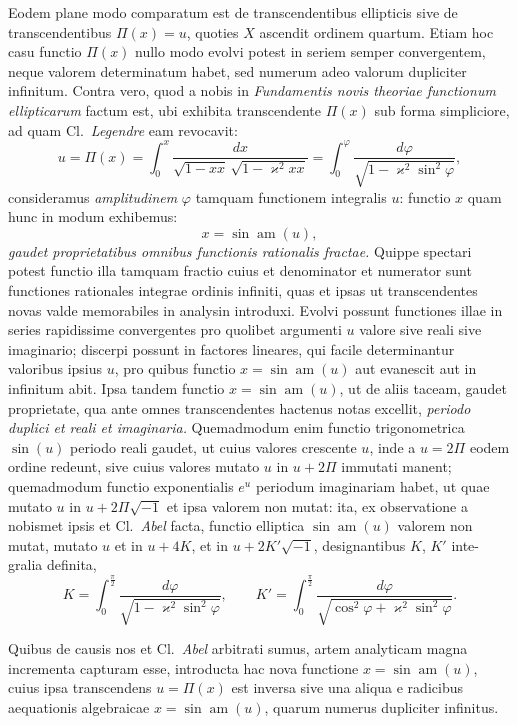 \documentclass{article}
\begin{document}
Eodem plane modo comparatum est de transcendentibus ellipticis sive de transcendentibus $\Pi(x) = u$, quoties $X$ ascendit ordinem quartum. Etiam hoc casu functio $\Pi(x)$ nullo modo evolvi potest in seriem semper convergentem, neque valorem determinatum habet, sed numerum adeo valorum dupliciter infinitum. Contra vero, quod a nobis in \emph{Fundamentis novis theoriae functionum ellipticarum} factum est, ubi exhibita transcendente $\Pi(x)$ sub forma simpliciore, ad quam Cl.\ \emph{Legendre} eam revocavit:
\[ u = \Pi(x) = \int_0^{x} \frac{dx}{\sqrt{1-xx}\,\sqrt{1-\varkappa^{2}xx}} = \int_0^{\varphi} \frac{d\varphi}{\sqrt{1-\varkappa^{2}\sin^{2}\varphi}}, \]
consideramus \emph{amplitudinem} $\varphi$ tamquam functionem integralis $u$: functio $x$ quam hunc in modum exhibemus:
\[ x = \sin\operatorname{am}(u), \]
\emph{gaudet proprietatibus omnibus functionis rationalis fractae.} Quippe spectari potest functio illa tamquam fractio cuius et denominator et numerator sunt functiones rationales integrae ordinis infiniti, quas et ipsas ut transcendentes novas valde memorabiles in analysin introduxi. Evolvi possunt functiones illae in series rapidissime convergentes pro quolibet argumenti $u$ valore sive reali sive imaginario; discerpi possunt in factores lineares, qui facile determinantur valoribus ipsius $u$, pro quibus functio $x = \sin\operatorname{am}(u)$ aut evanescit aut in infinitum abit. Ipsa tandem functio $x = \sin\operatorname{am}(u)$, ut de aliis taceam, gaudet proprietate, qua ante omnes transcendentes hactenus notas excellit, \emph{periodo duplici et reali et imaginaria.} Quemadmodum enim functio trigonometrica $\sin(u)$ periodo reali gaudet, ut cuius valores crescente $u$, inde a $u = 2\Pi$ eodem ordine redeunt, sive cuius valores mutato $u$ in $u + 2\Pi$ immutati manent; quemadmodum functio exponentialis $e^{u}$ periodum imaginariam habet, ut quae mutato $u$ in $u + 2\Pi\sqrt{-1}$ et ipsa valorem non mutat: ita, ex observatione a nobismet ipsis et Cl.\ \emph{Abel} facta, functio elliptica $\sin\operatorname{am}(u)$ valorem non mutat, mutato $u$ et in $u + 4K$, et in $u + 2K'\sqrt{-1}$, designantibus $K$, $K'$ inte-
gralia definita,
\[ K = \int_0^{\frac{\pi}{2}} \frac{d\varphi}{\sqrt{1-\varkappa^{2}\sin^{2}\varphi}}, \qquad K' = \int_0^{\frac{\pi}{2}} \frac{d\varphi}{\sqrt{\cos^{2}\varphi + \varkappa^{2}\sin^{2}\varphi}}. \]

Quibus de causis nos et Cl.\ \emph{Abel} arbitrati sumus, artem analyticam magna incrementa capturam esse, introducta hac nova functione $x = \sin\operatorname{am}(u)$, cuius ipsa transcendens $u = \Pi(x)$ est inversa sive una aliqua e radicibus aequationis algebraicae $x = \sin\operatorname{am}(u)$, quarum numerus dupliciter infinitus.
\end{document}
